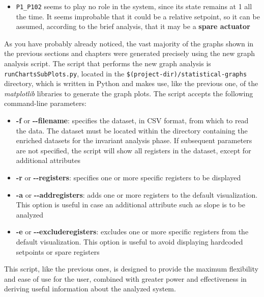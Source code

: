 \begin{itemize}
	\item \texttt{P1\_P102} seems to play no role in the system, since its state remains at 1 all the time. It seems improbable that it could be a relative setpoint, so it can be assumed, according to the brief analysis, that it may be a \textbf{spare actuator}
\end{itemize}

\bigskip
As you have probably already noticed, the vast majority of the graphs shown in the previous sections and chapters were generated precisely using the new graph analysis script.\newline
The script that performs the new graph analysis is \texttt{runChartsSubPlots.py}, located in the \texttt{\$(project-dir)/statistical-graphs} directory, which is written in Python and makes use, like the previous one, of the \textit{matplotlib} libraries to generate the graph plots.\newline
The script accepts the following command-line parameters:

\begin{itemize}
	\item \textbf{-f} or \textbf{{-}{-}filename}: specifies the dataset, in CSV format, from which to read the data. The dataset must be located within the directory containing the enriched datasets for the invariant analysis phase. If subsequent parameters are not specified, the script will show all registers in the dataset, except for additional attributes
	
	\item \textbf{-r} or \textbf{{-}{-}registers}: specifies one or more specific registers to be displayed
	
	\item \textbf{-a} or \textbf{{-}{-}addregisters}: adds one or more registers to the default visualization. This option is useful in case an additional attribute such as slope is to be analyzed
	
	\item \textbf{-e} or \textbf{{-}{-}excluderegisters}: excludes one or more specific registers from the default visualization. This option is useful to avoid displaying hardcoded setpoints or spare registers
\end{itemize}
This script, like the previous ones, is designed to provide the maximum flexibility and ease of use for the user, combined with greater power and effectiveness in deriving useful information about the analyzed system.

